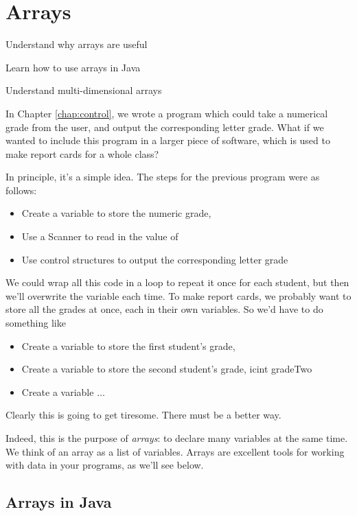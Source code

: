 \chapter{Arrays}
\label{ch:arrays}

\begin{goals}
\item Understand why arrays are useful
\item Learn how to use arrays in Java
\item Understand multi-dimensional arrays
\end{goals}

In Chapter \ref{chap:control}, we wrote a program which could take a numerical grade from the user, and output the corresponding letter grade. What if we wanted to include this program in a larger piece of software, which is used to make report cards for a whole class?

In principle, it's a simple idea. The steps for the previous program were as follows:
\begin{itemize}
    \item Create a variable to store the numeric grade, 
    \item Use a Scanner to read in the value of 
    \item Use control structures to output the corresponding letter grade
\end{itemize}
We could wrap all this code in a  loop to repeat it once for each student, but then we'll overwrite the  variable each time. To make report cards, we probably want to store all the grades at once, each in their own variables. So we'd have to do something like
\begin{itemize}
    \item Create a variable to store the first student's grade, 
    \item Create a variable to store the second student's grade, ic{int gradeTwo}
    \item Create a variable $\ldots$
\end{itemize}
Clearly this is going to get tiresome. There must be a better way.

Indeed, this is the purpose of \emph{arrays}: to declare many variables at the same time. We think of an array as a list of variables. Arrays are excellent tools for working with data in your programs, as we'll see below.

\section{Arrays in Java}

